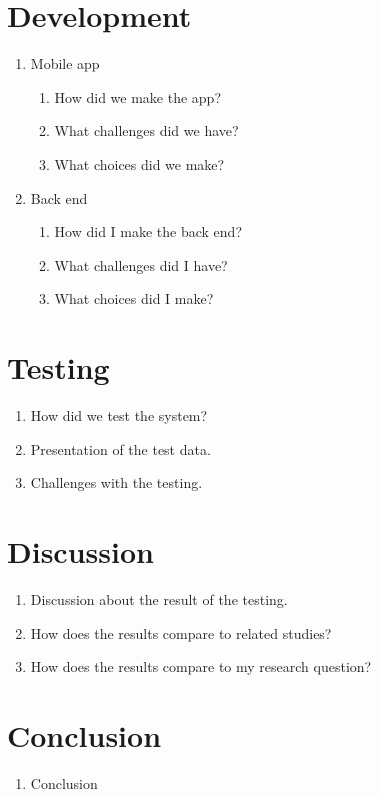 \documentclass[../Main/thesis.tex]{subfiles}
\begin{document}
\section*{Development}
\begin{enumerate}
	\item Mobile app
	\begin{enumerate}
		\item How did we make the app?
		\item What challenges did we have?
		\item What choices did we make?
	\end{enumerate}

	\item Back end
	\begin{enumerate}
		\item How did I make the back end?
		\item What challenges did I have?
		\item What choices did I make?
	\end{enumerate}
\end{enumerate}

\section*{Testing}
\begin{enumerate}
	\item How did we test the system?
	\item Presentation of the test data.
	\item Challenges with the testing.
\end{enumerate}

\section*{Discussion}
\begin{enumerate}
	\item Discussion about the result of the testing. 
	\item How does the results compare to related studies?
	\item How does the results compare to my research question?
\end{enumerate}

\section*{Conclusion}
\begin{enumerate}
	\item Conclusion
\end{enumerate}
\end{document}
